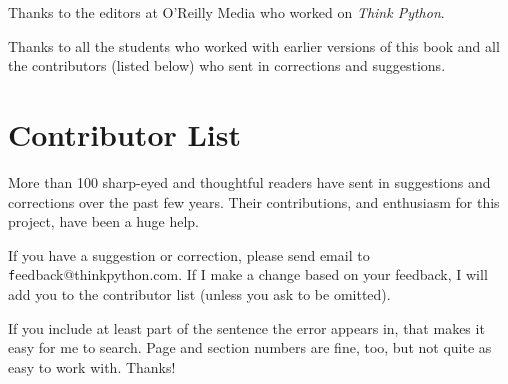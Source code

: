 \documentclass[
DIV=11,
fontsize=12,
twoside,
headinclude=false,
titlepage=firstiscover,
abstract=true,
headsepline=true,
footsepline=true,
chapterprefix=true, %
headings=big,
bibliography=totoc,%
captions=tableheading
]{scrbook}
\theoremstyle{definition}
\begin{document}
Thanks to the editors at O'Reilly Media who worked on
{\em Think Python}.

Thanks to all the students who worked with earlier
versions of this book and all the contributors (listed
below) who sent in corrections and suggestions.


\section*{Contributor List}

More than 100 sharp-eyed and thoughtful readers have sent in
suggestions and corrections over the past few years.  Their
contributions, and enthusiasm for this project, have been a
huge help.

If you have a suggestion or correction, please send email to 
{\texttt feedback@thinkpython.com}.  If I make a change based on your
feedback, I will add you to the contributor list
(unless you ask to be omitted).

If you include at least part of the sentence the
error appears in, that makes it easy for me to search.  Page and
section numbers are fine, too, but not quite as easy to work with.
Thanks!
\end{document}
